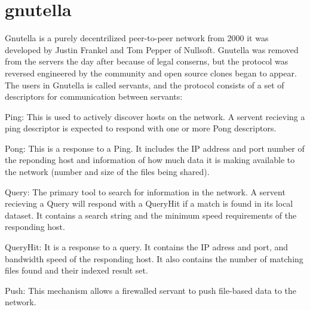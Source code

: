 \label{sec:gnutella}
\section{gnutella}
Gnutella is a purely decentrilized peer-to-peer network from 2000 it was developed by Justin Frankel and Tom Pepper of Nullsoft. Gnutella was removed from the servers the day after because of legal conserns, but the protocol was reversed engineered by the community and open source clones began to appear.
The users in Gnutella is called servants, and the protocol consists of a set of descriptors for communication between servants:
\begin{enummerate}
\item Ping: This is used to actively discover hosts on the network. A servent recieving a ping descriptor is expected to respond with one or more Pong descriptors.
\item Pong: This is a response to a Ping. It includes the IP address and port number of the reponding host and information of how much data it is making available to the network (number and size of the files being shared).
\item Query: The primary tool to search for information in the network. A servent recieving a Query will respond with a QueryHit if a match is found in its local dataset. It contains a search string and the minimum speed requirements of the responding host.
\item QueryHit: It is a response to a query. It contains the IP adress and port, and bandwidth speed of the responding host. It also contains the number of matching files found and their indexed result set.
\item Push: This mechanism allows a firewalled servant to push file-based data to the network.
\end{enummerate}
